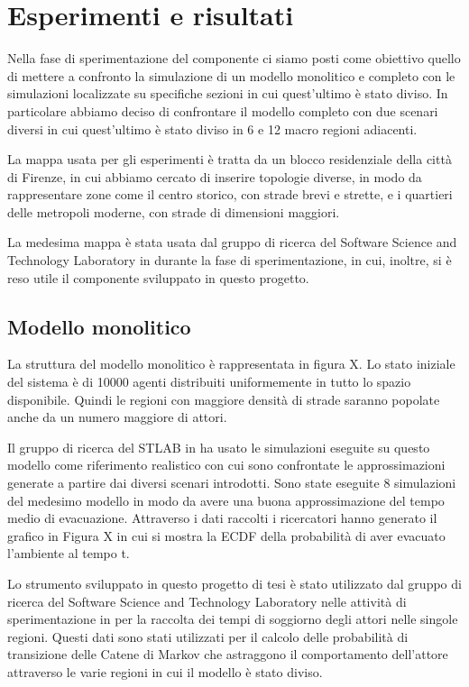 \chapter{Esperimenti e risultati}

Nella fase di sperimentazione del componente ci siamo posti come obiettivo quello di mettere a confronto la simulazione di un modello monolitico e completo con le simulazioni localizzate su specifiche sezioni in cui quest'ultimo è stato diviso. In particolare abbiamo deciso di confrontare il modello completo con due scenari diversi in cui quest'ultimo è stato diviso in 6 e 12 macro regioni adiacenti.

La mappa usata per gli esperimenti è tratta da un blocco residenziale della città di Firenze, in cui abbiamo cercato di inserire topologie diverse, in modo da rappresentare zone come il centro storico, con strade brevi e strette, e i quartieri delle metropoli moderne, con strade di dimensioni maggiori.

La medesima mappa è stata usata dal gruppo di ricerca del Software Science and Technology Laboratory in \cite{esperimenti-sandro} durante la fase di sperimentazione, in cui, inoltre, si è reso utile il componente sviluppato in questo progetto.

\section{Modello monolitico}
La struttura del modello monolitico è rappresentata in figura X. Lo stato iniziale del sistema è di 10000 agenti distribuiti uniformemente in tutto lo spazio disponibile. Quindi le regioni con maggiore densità di strade saranno popolate anche da un numero maggiore di attori. 

Il gruppo di ricerca del STLAB in \cite{esperimenti-sandro} ha usato le simulazioni eseguite su questo modello come riferimento realistico con cui sono confrontate le approssimazioni generate a partire dai diversi scenari introdotti. Sono state eseguite 8 simulazioni del medesimo modello in modo da avere una buona approssimazione del tempo medio di evacuazione. Attraverso i dati raccolti i ricercatori hanno generato il grafico in Figura X in cui si mostra la ECDF della probabilità di aver evacuato l'ambiente al tempo t.

Lo strumento sviluppato in questo progetto di tesi è stato utilizzato dal gruppo di ricerca del Software Science and Technology Laboratory nelle attività di sperimentazione in \cite{esperimenti-sandro} per la raccolta dei tempi di soggiorno degli attori nelle singole regioni. Questi dati sono stati utilizzati per il calcolo delle probabilità di transizione delle Catene di Markov che astraggono il comportamento dell'attore attraverso le varie regioni in cui il modello è stato diviso.

 